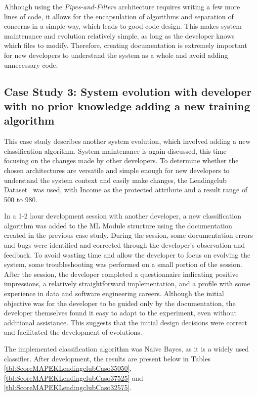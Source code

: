\documentclass[sigconf]{acmart}
\begin{document}
Although using the \textit{Pipes-and-Filters} architecture requires writing a few more lines of code, it allows for the encapsulation of algorithms and separation of concerns in a simple way, which leads to good code design. This makes system maintenance and evolution relatively simple, as long as the developer knows which files to modify. Therefore, creating documentation is extremely important for new developers to understand the system as a whole and avoid adding unnecessary code.

\subsection{Case Study 3: System evolution with developer with no prior knowledge adding a new training algorithm}

This case study describes another system evolution, which involved adding a new classification algorithm. System maintenance is again discussed, this time focusing on the changes made by other developers. To determine whether the chosen architectures are versatile and simple enough for new developers to understand the system context and easily make changes, the Lendingclub Dataset~\citep{lendingclub_2022} was used, with Income as the protected attribute and a result range of 500 to 980.

In a 1-2 hour development session with another developer, a new classification algorithm was added to the ML Module structure using the documentation created in the previous case study. During the session, some documentation errors and bugs were identified and corrected through the developer's observation and feedback. To avoid wasting time and allow the developer to focus on evolving the system, some troubleshooting was performed on a small portion of the session. After the session, the developer completed a questionnaire indicating positive impressions, a relatively straightforward implementation, and a profile with some experience in data and software engineering careers. Although the initial objective was for the developer to be guided only by the documentation, the developer themselves found it easy to adapt to the experiment, even without additional assistance. This suggests that the initial design decisions were correct and facilitated the development of evolutions.

The implemented classification algorithm was Naive Bayes, as it is a widely used classifier. After development, the results are present below in Tables \ref{tbl:ScoreMAPEKLendingclubCaso35050}, \ref{tbl:ScoreMAPEKLendingclubCaso37525} and \ref{tbl:ScoreMAPEKLendingclubCaso32575}.
\end{document}

